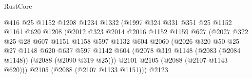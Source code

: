 \begin{lexlean}{RustCore}
\begin{coremodule}
                                    @416
                                    @25
                                    @1152
                                    @1208
                                    @1234
                                    @1332
                                    (@1997
                                      @324
                                      @331
                                      @351
                                      @25
                                      @1152
                                      @1161
                                      @620
                                      @1208
                                      (@2012
                                        @323
                                        @2014
                                        @2016
                                        @1152
                                        @1159
                                        @627
                                        (@2027
                                          @322
                                          @25
                                          @28
                                          @607
                                          @1151
                                          @1158
                                          @597
                                          @1132
                                          @604
                                          @2060
                                          (@2026
                                            @320
                                            @50
                                            @25
                                            @27
                                            @1148
                                            @620
                                            @637
                                            @597
                                            @1142
                                            @604
                                            (@2078
                                              @319
                                              @1148
                                              (@2083 (@2084 @1148))
                                              (@2088 (@2090 @319 @25)))
                                            @2101
                                            @2105
                                            (@2088 (@2107 @1143 @620)))
                                          @2105
                                          (@2088 (@2107 @1133 @1151)))
                                        @2123

\end{coremodule}
\end{lexlean}
